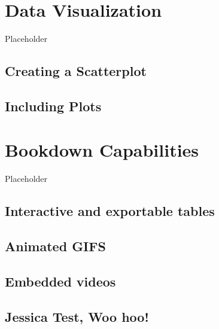 \documentclass[
]{book}
\begin{document}
\hypertarget{data-visualization}{%
\chapter{Data Visualization}\label{data-visualization}}

Placeholder

\hypertarget{creating-a-scatterplot}{%
\section{Creating a Scatterplot}\label{creating-a-scatterplot}}

\hypertarget{including-plots}{%
\section{Including Plots}\label{including-plots}}

\hypertarget{bookdown-capabilities}{%
\chapter{Bookdown Capabilities}\label{bookdown-capabilities}}

Placeholder

\hypertarget{interactive-and-exportable-tables}{%
\section{Interactive and exportable tables}\label{interactive-and-exportable-tables}}

\hypertarget{animated-gifs}{%
\section{Animated GIFS}\label{animated-gifs}}

\hypertarget{embedded-videos}{%
\section{Embedded videos}\label{embedded-videos}}

\hypertarget{jessica-test-woo-hoo}{%
\section{Jessica Test, Woo hoo!}\label{jessica-test-woo-hoo}}

  
\end{document}
